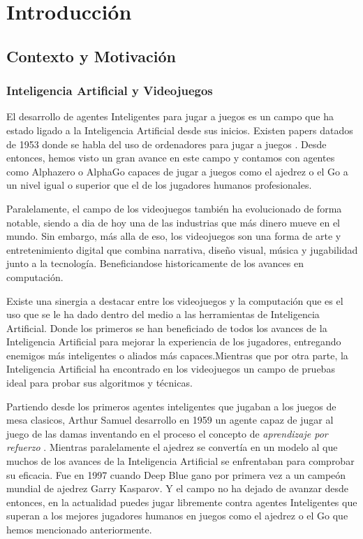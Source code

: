 \chapter{Introducción}

\section{Contexto y Motivación}

\subsection{Inteligencia Artificial y Videojuegos}

El desarrollo de agentes Inteligentes para jugar a juegos es un campo que ha estado ligado a la Inteligencia Artificial desde sus inicios. Existen papers datados de 1953 donde se habla del uso de ordenadores para jugar a juegos \cite{Turing_1953a}. Desde entonces, hemos visto un gran avance en este campo y contamos con agentes como Alphazero \cite{1712.01815} o AlphaGo \cite{AlphaGo} capaces de jugar a juegos como el ajedrez o el Go a un nivel igual o superior que el de los jugadores humanos profesionales. 

Paralelamente, el campo de los videojuegos también ha evolucionado de forma notable, siendo a dia de hoy una de las industrias que más dinero mueve en el mundo. Sin embargo, más alla de eso, los videojuegos son una forma de arte y entretenimiento digital que combina narrativa, diseño visual, música y jugabilidad junto a la tecnología. Beneficiandose historicamente de los avances en computación. 

Existe una sinergia a destacar entre los videojuegos y la computación que es el uso que se le ha dado dentro del medio a las herramientas de Inteligencia Artificial. Donde los primeros se han beneficiado de todos los avances de la Inteligencia Artificial para mejorar la experiencia de los jugadores, entregando enemigos más inteligentes o aliados más capaces.Mientras que por otra parte, la Inteligencia Artificial ha encontrado en los videojuegos un campo de pruebas ideal para probar sus algoritmos y técnicas.

Partiendo desde los primeros agentes inteligentes que jugaban a los juegos de mesa clasicos, Arthur Samuel desarrollo en 1959 un agente capaz de jugar al juego de las damas inventando en el proceso el concepto de \textit{aprendizaje por refuerzo} \cite{CheckersSamuel1959}. Mientras paralelamente el ajedrez se convertía en un modelo al que muchos de los avances de la Inteligencia Artificial se enfrentaban para comprobar su eficacia. Fue en 1997 cuando Deep Blue gano por primera vez a un campeón mundial de ajedrez Garry Kasparov. Y el campo no ha dejado de avanzar desde entonces, en la actualidad puedes jugar libremente contra agentes Inteligentes que superan a los mejores jugadores humanos en juegos como el ajedrez o el Go que hemos mencionado anteriormente.

